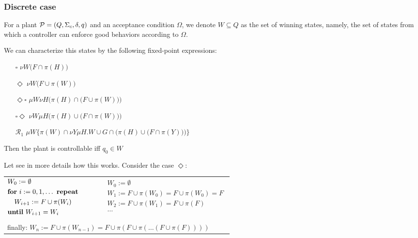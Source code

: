 \documentclass[table]{beamer}
\begin{document}
\begin{frame}
	\frametitle{Discrete case}
	\begin{dfn}
		For a plant $\mathcal{P}=(Q,\Sigma_c,\delta, q)$ and an acceptance condition $\Omega$, we denote $W \subseteq Q$ as the set
		of winning states, namely, the set of states from which a controller can enforce good behaviors according to $\Omega$.
	\end{dfn}
\end{frame}
\begin{frame}
	We can characterize this states by the following fixed-point expressions:
	\begin{itemize}
		\item[$\square$] $\nu W \big( F \cap \pi(H)\big)$ 
		\item[$\Diamond$] $\nu W\big(F \cup \pi(W)\big)$ 
		\item[$\Diamond\square$] $\mu W \nu H\Big(\pi(H) \cap \big(F \cup \pi(W)\big)\Big)$
		\item[$\square\Diamond$] $\nu W \mu H\Big(\pi(H) \cup \big(F \cap \pi(W)\big)\Big)$
		\item[$\mathcal{R}_1$] $\mu W \Bigg\{\pi(W) \cap \nu Y \mu H . W \cup G \cap \Big(\pi(H) \cup \big(F \cap \pi(Y)\big)\Big)\Bigg\}$
	\end{itemize}
	Then the plant is controllable iff $q_0 \in W$
\end{frame}
\begin{frame}
	Let see in more details how this works. Consider the case $\Diamond$:
	\begin{table}[]
		\begin{tabular}{lll}
		$\begin{aligned}
			&W_0 := \emptyset \\
			&\textrm{\textbf{for} } i:=0,1,\ldots \textrm{ \textbf{repeat}} \\
			& \quad W_{i+1} := F \cup \pi(W_i) \\
			&\textrm{\textbf{until} } W_{i+1} = W_i\\
		\end{aligned}$
		& $\quad$ &
		$\begin{aligned}
			&W_0 := \emptyset \\
			&W_1 := F \cup \pi(W_0) = F \cup \pi(W_0) = F \\
			&W_2 := F \cup \pi(W_1) = F \cup \pi(F)\\
			& \ldots \\
		\end{aligned}$ \\
		&&\\%
		\multicolumn{3}{l}{finally: $W_n := F \cup \pi(W_{n-1}) = F \cup \pi(F \cup \pi(\ldots(F \cup \pi(F))))$}
		\end{tabular}
	\end{table}
\end{frame}
\end{document}
